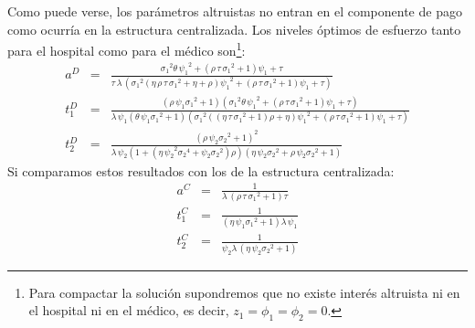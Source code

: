 ﻿\documentclass[12pt,letterpaper]{article}
\begin{document}
Como puede verse, los parámetros altruistas no entran en el componente de pago como ocurría en la estructura centralizada. Los niveles óptimos de esfuerzo tanto para el hospital como para el médico son\footnote{Para compactar la solución supondremos que no existe interés altruista ni en el hospital ni en el médico, es decir, $z_1=\phi_1=\phi_2=0$.}:
\begin{eqnarray*}
a^D&=&{\frac {{\sigma_{{1}}}^{2}\theta\,{\psi_{{1}}}^{2}+ \left( \rho\,\tau
\,{\sigma_{{1}}}^{2}+1 \right) \psi_{{1}}+\tau}{\tau\,\lambda\,
 \left( {\sigma_{{1}}}^{2} \left( \eta\,\rho\,\tau\,{\sigma_{{1}}}^{2}
+\eta+\rho \right) {\psi_{{1}}}^{2}+ \left( \rho\,\tau\,{\sigma_{{1}}}
^{2}+1 \right) \psi_{{1}}+\tau \right) }}\\
t_1^D&=&{\frac { \left( \rho\,\psi_{{1}}{\sigma_{{1}}}^{2}+1 \right)  \left( {
\sigma_{{1}}}^{2}\theta\,{\psi_{{1}}}^{2}+ \left( \rho\,\tau\,{\sigma_
{{1}}}^{2}+1 \right) \psi_{{1}}+\tau \right) }{\lambda\,\psi_{{1}}
 \left( \theta\,\psi_{{1}}{\sigma_{{1}}}^{2}+1 \right)  \left( {\sigma
_{{1}}}^{2} \left(  \left( \eta\,\tau\,{\sigma_{{1}}}^{2}+1 \right)
\rho+\eta \right) {\psi_{{1}}}^{2}+ \left( \rho\,\tau\,{\sigma_{{1}}}^
{2}+1 \right) \psi_{{1}}+\tau \right) }}\\
t_2^D&=& {\frac { \left( \rho\,\psi_{{2}}{\sigma_{{2}}}^{2}+1 \right) ^{2}}{
\lambda\,\psi_{{2}} \left( 1+ \left( \eta\,{\psi_{{2}}}^{2}{\sigma_{{2
}}}^{4}+\psi_{{2}}{\sigma_{{2}}}^{2} \right) \rho \right)  \left( \eta
\,\psi_{{2}}{\sigma_{{2}}}^{2}+\rho\,\psi_{{2}}{\sigma_{{2}}}^{2}+1
 \right) }}
\end{eqnarray*}
Si comparamos estos resultados con los de la estructura centralizada:
\begin{eqnarray*}
  a^C &=& {\frac {1}{\lambda\, \left( \rho\,\tau\,{\sigma_{{1}}}^{2}+1 \right)
\tau}}\\
  t_1^C &=& {\frac {1}{ \left( \eta\,\psi_{{1}}{\sigma_{{1}}}^{2}+1 \right)
\lambda\,\psi_{{1}}}} \\
  t_2^C &=& {\frac {1}{\psi_{{2}}\lambda\, \left( \eta\,\psi_{{2}}{\sigma_{{2}}}^{2}+1 \right) }}
\end{eqnarray*}
\end{document}
